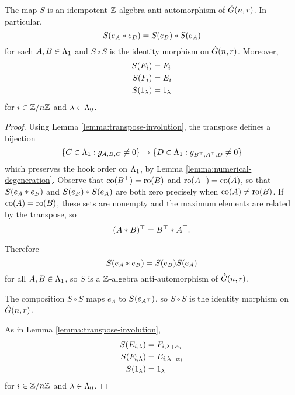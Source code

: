 \documentclass[a4paper, 11pt, twoside]{report}
\begin{document}
\begin{lemma}\label{lemma:transpose-involution-generic}
The map $S$ is an idempotent $\mathbb{Z}$-algebra anti-automorphism of $\hat{G}(n,r)$. In particular,
\begin{equation*}
S{(e_A\ast e_B)} = S{(e_B)}\ast S{(e_A)}
\end{equation*}
for each $A,B\in\Lambda_1{}$ and $S\circ S$ is the identity morphism on $\hat{G}(n,r)$. Moreover,
\begin{align*}
S{(E_i)} &= F_i\\
S{(F_i)} &= E_i\\
S{(1_\lambda)} &= 1_\lambda
\end{align*}
for $i\in\mathbb{Z}/{n \mathbb{Z}}$ and $\lambda\in\Lambda_0{}$.
\end{lemma}

\begin{proof}
Using Lemma \ref{lemma:transpose-involution}, the transpose defines a bijection
\begin{equation*}
\{C\in\Lambda_1{}:g_{A,B,C}\neq 0\}\to\{D\in\Lambda_1{}:g_{B^\top,A^\top,D}\neq 0\}
\end{equation*}
which preserves the hook order on $\Lambda_1{}$, by Lemma \ref{lemma:numerical-degeneration}. Observe that $\operatorname{co}(B^\top)=\operatorname{ro}(B)$ and $\operatorname{ro}(A^\top)=\operatorname{co}(A)$, so that $S{(e_A\ast e_B)}$ and $S{(e_B)}\ast S{(e_A)}$ are both zero precisely when $\operatorname{co}(A)\neq\operatorname{ro}(B)$. If $\operatorname{co}(A)=\operatorname{ro}(B)$, these sets are nonempty and the maximum elements are related by the transpose, so
\begin{equation*}
(A\ast B)^\top = B^\top \ast A^\top.
\end{equation*}

Therefore
\begin{equation*}
S{(e_A\ast e_B)} = S{(e_B)}S{(e_A)}
\end{equation*}
for all $A,B\in\Lambda_1{}$, so $S$ is a $\mathbb{Z}$-algebra anti-automorphism of $\hat{G}(n,r)$.

The composition $S\circ S$ maps $e_A$ to $S{(e_{A^\top})}$, so $S\circ S$ is the identity morphism on $\hat{G}(n,r)$.

As in Lemma \ref{lemma:transpose-involution},
\begin{align*}
S{(E_{i,\lambda})} &= F_{i,\lambda+\alpha_i}\\
S{(F_{i,\lambda})} &= E_{i,\lambda-\alpha_i}\\
S{(1_\lambda)} &= 1_\lambda
\end{align*}
for $i\in\mathbb{Z}/{n \mathbb{Z}}$ and $\lambda\in\Lambda_0{}$.
\end{proof}
\end{document}
